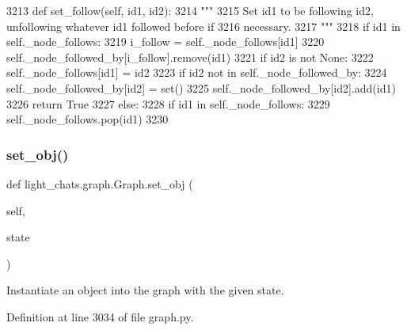 \begin{DoxyCode}
3213     \textcolor{keyword}{def }set\_follow(self, id1, id2):
3214         \textcolor{stringliteral}{"""}
3215 \textcolor{stringliteral}{        Set id1 to be following id2, unfollowing whatever id1 followed before if}
3216 \textcolor{stringliteral}{        necessary.}
3217 \textcolor{stringliteral}{        """}
3218         \textcolor{keywordflow}{if} id1 \textcolor{keywordflow}{in} self.\_node\_follows:
3219             i\_follow = self.\_node\_follows[id1]
3220             self.\_node\_followed\_by[i\_follow].remove(id1)
3221         \textcolor{keywordflow}{if} id2 \textcolor{keywordflow}{is} \textcolor{keywordflow}{not} \textcolor{keywordtype}{None}:
3222             self.\_node\_follows[id1] = id2
3223             \textcolor{keywordflow}{if} id2 \textcolor{keywordflow}{not} \textcolor{keywordflow}{in} self.\_node\_followed\_by:
3224                 self.\_node\_followed\_by[id2] = set()
3225             self.\_node\_followed\_by[id2].add(id1)
3226             \textcolor{keywordflow}{return} \textcolor{keyword}{True}
3227         \textcolor{keywordflow}{else}:
3228             \textcolor{keywordflow}{if} id1 \textcolor{keywordflow}{in} self.\_node\_follows:
3229                 self.\_node\_follows.pop(id1)
3230 
\end{DoxyCode}
\mbox{\label{classlight__chats_1_1graph_1_1Graph_ac46849fddce61ce035feb6ea683b9009}} 
\subsubsection{\texorpdfstring{set\+\_\+obj()}{set\_obj()}}
{\footnotesize\ttfamily def light\+\_\+chats.\+graph.\+Graph.\+set\+\_\+obj (\begin{DoxyParamCaption}\item[{}]{self,  }\item[{}]{state }\end{DoxyParamCaption})}

\begin{DoxyVerb}Instantiate an object into the graph with the given state.
\end{DoxyVerb}
 

Definition at line 3034 of file graph.\+py.


